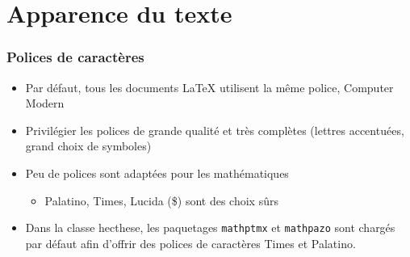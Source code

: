 \section{Apparence du texte}


\begin{frame}[c]

	\frametitle{Polices de caractères}
	
	\begin{itemize}
		\item Par défaut, tous les documents {\LaTeX} utilisent la même police,
			\textrm{Computer Modern}
		\item Privilégier les polices de grande qualité et très complètes (lettres accentuées, grand 	choix de symboles)
		\item Peu de polices sont adaptées pour les mathématiques
			\begin{itemize}
				\item Palatino, Times, Lucida (\$) sont des choix sûrs
			\end{itemize}
		\item Dans la classe hecthese, les paquetages \texttt{mathptmx} et \texttt{mathpazo} sont chargés par défaut afin d'offrir des polices de caractères Times et Palatino.
	\end{itemize}
\end{frame}


